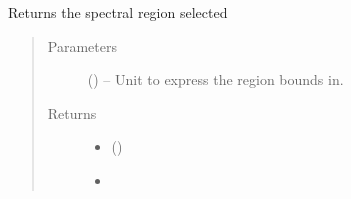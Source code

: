 \documentclass[letterpaper,10pt,english]{sphinxmanual}
\begin{document}
\begin{fulllineitems}
\begin{fulllineitems}
\begin{quote}
\begin{description}
\begin{itemize}
\end{itemize}

\end{description}\end{quote}

\end{fulllineitems}


\begin{fulllineitems}
\label{\detokenize{references/freqfilter:nmrespy.freqfilter.FrequencyFilter.get_region}}
\sphinxAtStartPar
Returns the spectral region selected
\begin{quote}\begin{description}
\item[{Parameters}] \leavevmode
\sphinxAtStartPar
{} (\sphinxstyleliteralemphasis{\sphinxupquote{, }}\sphinxstyleliteralemphasis{\sphinxupquote{, }}\sphinxstyleliteralemphasis{\sphinxupquote{, }}) – Unit to express the region bounds in.

\item[{Returns}] \leavevmode
\sphinxAtStartPar
\begin{itemize}
\item {} 
\sphinxAtStartPar
{} ()

\item {} 
\sphinxAtStartPar
{}

\end{itemize}


\end{description}\end{quote}

\end{fulllineitems}



\end{fulllineitems}
\end{document}
